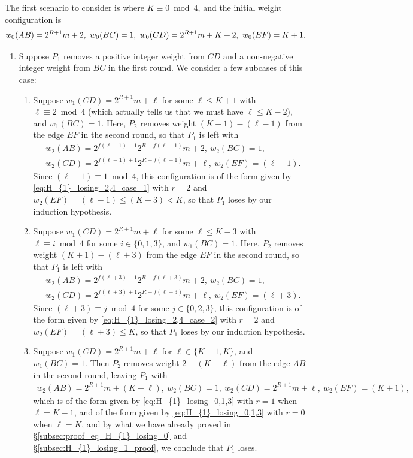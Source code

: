 \documentclass[11pt,reqno]{amsart}
\theoremstyle{definition}
\theoremstyle{definition}
\begin{document}
The first scenario to consider is where $K\equiv 0 \bmod 4$, and the initial weight configuration is
\begin{equation}
w_{0}(AB)=2^{R+1}m+2,\ w_{0}(BC)=1,\ w_{0}(CD)=2^{R+1}m+K+2,\ w_{0}(EF)=K+1.\label{eq:H_{1}_losing_2_inductive_1}
\end{equation}
\begin{enumerate}
\item Suppose $P_{1}$ removes a positive integer weight from $CD$ and a non-negative integer weight from $BC$ in the first round. We consider a few subcases of this case:
\begin{enumerate}
\item Suppose $w_{1}(CD)=2^{R+1}m+\ell$ for some $\ell \leqslant K+1$ with $\ell\equiv 2\bmod 4$ (which actually tells us that we must have $\ell\leqslant K-2$), and $w_{1}(BC)=1$. Here, $P_{2}$ removes weight $(K+1)-(\ell-1)$ from the edge $EF$ in the second round, so that $P_{1}$ is left with
\begin{align}
{}&w_{2}(AB)=2^{f(\ell-1)+1}2^{R-f(\ell-1)}m+2,\ w_{2}(BC)=1,\nonumber\\
{}&w_{2}(CD)=2^{f(\ell-1)+1}2^{R-f(\ell-1)}m+\ell,\ w_{2}(EF)=(\ell-1).\nonumber
\end{align}
Since $(\ell-1) \equiv 1 \bmod 4$, this configuration is of the form given by \eqref{eq:H_{1}_losing_2,4_case_1} with $r=2$ and $w_{2}(EF)=(\ell-1)\leqslant (K-3)<K$, so that $P_{1}$ loses by our induction hypothesis. 

\item Suppose $w_{1}(CD)=2^{R+1}m+\ell$ for some $\ell \leqslant K-3$ with $\ell\equiv i \bmod 4$ for some $i \in \{0,1,3\}$, and $w_{1}(BC)=1$. Here, $P_{2}$ removes weight $(K+1)-(\ell+3)$ from the edge $EF$ in the second round, so that $P_{1}$ is left with 
\begin{align}
{}&w_{2}(AB)=2^{f(\ell+3)+1}2^{R-f(\ell+3)}m+2,\ w_{2}(BC)=1,\nonumber\\
{}&w_{2}(CD)=2^{f(\ell+3)+1}2^{R-f(\ell+3)}m+\ell,\ w_{2}(EF)=(\ell+3).\nonumber
\end{align}
Since $(\ell+3) \equiv j \bmod 4$ for some $j \in \{0,2,3\}$, this configuration is of the form given by \eqref{eq:H_{1}_losing_2,4_case_2} with $r=2$ and $w_{2}(EF)=(\ell+3)\leqslant K$, so that $P_{1}$ loses by our induction hypothesis. 

\item Suppose $w_{1}(CD)=2^{R+1}m+\ell$ for $\ell\in\{K-1,K\}$, and $w_{1}(BC)=1$. Then $P_{2}$ removes weight $2-(K-\ell)$ from the edge $AB$ in the second round, leaving $P_{1}$ with
\begin{align}
w_{2}(AB)=2^{R+1}m+(K-\ell),\ w_{2}(BC)=1,\ w_{2}(CD)=2^{R+1}m+\ell,\ w_{2}(EF)=(K+1),\nonumber
\end{align}
which is of the form given by \eqref{eq:H_{1}_losing_0,1,3} with $r=1$ when $\ell=K-1$, and of the form given by \eqref{eq:H_{1}_losing_0,1,3} with $r=0$ when $\ell=K$, and by what we have already proved in \S\ref{subsec:proof_eq_H_{1}_losing_0} and \S\ref{subsec:H_{1}_losing_1_proof}, we conclude that $P_{1}$ loses.


\end{enumerate}
\end{enumerate}
\end{document}
